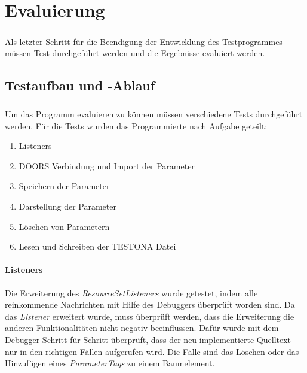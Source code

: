 \chapter{Evaluierung}\label{chp:Evaluierung}
\paragraph{}

Als letzter Schritt für die Beendigung der Entwicklung des Testprogrammes müssen Test durchgeführt werden und die Ergebnisse evaluiert werden.


\newpage
\section{Testaufbau und -Ablauf} \label{sec:test}
\paragraph{}
Um das Programm evaluieren zu können müssen verschiedene Tests durchgeführt werden. Für die Tests wurden das Programmierte nach Aufgabe geteilt:

\begin{enumerate}
\item Listeners
\item DOORS Verbindung und Import der Parameter
\item Speichern der Parameter
\item Darstellung der Parameter
\item Löschen von Parametern
\item Lesen und Schreiben der TESTONA Datei
\end{enumerate}


\subsubsection{Listeners}
Die Erweiterung des \textit{ResourceSetListeners} wurde getestet, indem alle reinkommende Nachrichten mit Hilfe des Debuggers überprüft worden sind. Da das \textit{Listener} erweitert wurde, muss überprüft werden, dass die Erweiterung die anderen Funktionalitäten nicht negativ beeinflussen. Dafür wurde mit dem Debugger Schritt für Schritt überprüft, dass der neu implementierte Quelltext nur in den richtigen Fällen aufgerufen wird. Die Fälle sind das Löschen oder das Hinzufügen eines \textit{ParameterTags} zu einem Baumelement.\\



